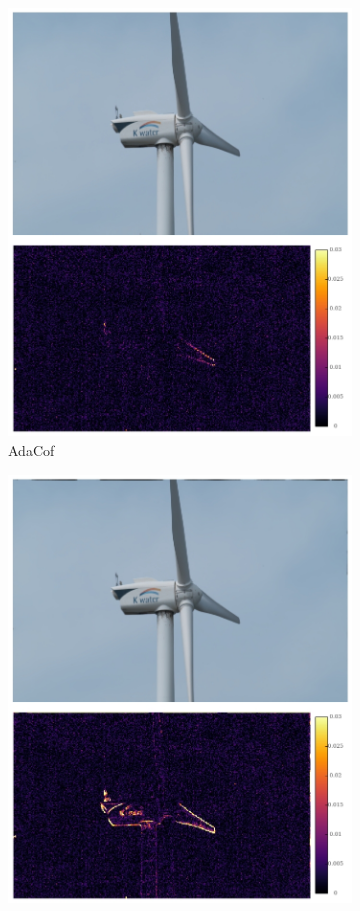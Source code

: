 \documentclass{article}
\begin{document}
\begin{figure}[h]
\begin{subfigure}{0.14\textwidth}
    \includegraphics[width=1\linewidth]{qua_imgs/TEST02_045_f0465_adacof.jpg}
    \caption{AdaCof}
\end{subfigure}%
\begin{subfigure}{0.14\textwidth}
	\centering
    \includegraphics[width=1\linewidth]{qua_imgs/TEST02_045_f0465_bmbc.jpg}

\end{subfigure}
\end{figure}
\end{document}
